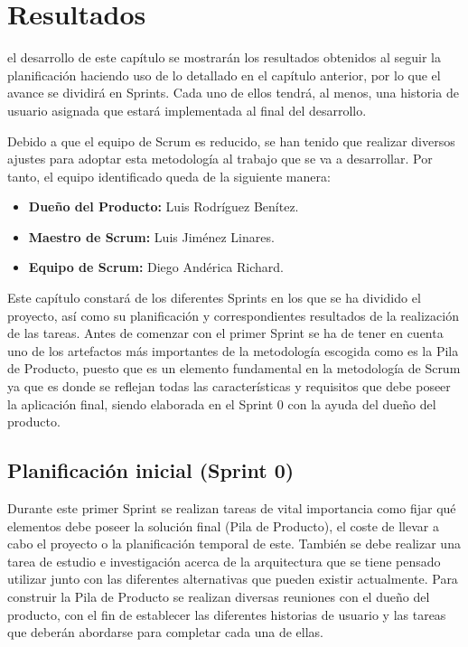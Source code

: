 \chapter{Resultados}
\label{chap:resultados}

 el desarrollo de este capítulo se mostrarán los resultados obtenidos al seguir la planificación haciendo uso de lo detallado en el capítulo anterior, por lo que el avance se dividirá en Sprints. Cada uno de ellos tendrá, al menos, una historia de usuario asignada que estará implementada al final del desarrollo.

Debido a que el equipo de Scrum es reducido, se han tenido que realizar diversos ajustes para adoptar esta metodología al trabajo que se va a desarrollar. Por tanto, el equipo identificado queda de la siguiente manera:

\begin{itemize}
	\item \textbf{Dueño del Producto:} Luis Rodríguez Benítez.
	\item \textbf{Maestro de Scrum:} Luis Jiménez Linares.
	\item \textbf{Equipo de Scrum:} Diego Andérica Richard.
\end{itemize}

Este capítulo constará de los diferentes Sprints en los que se ha dividido el proyecto, así como su planificación y correspondientes resultados de la realización de las tareas. Antes de comenzar con el primer Sprint se ha de tener en cuenta uno de los artefactos más importantes de la metodología escogida como es la Pila de Producto, puesto que es un elemento fundamental en la metodología de Scrum ya que es donde se reflejan todas las características y requisitos que debe poseer la aplicación final, siendo elaborada en el Sprint 0 con la ayuda del dueño del producto.

\clearpage

\section{Planificación inicial (Sprint 0)}
Durante este primer Sprint se realizan tareas de vital importancia como fijar qué elementos debe poseer la solución final (Pila de Producto), el coste de llevar a cabo el proyecto o la planificación temporal de este. También se debe realizar una tarea de estudio e investigación acerca de la arquitectura que se tiene pensado utilizar junto con las diferentes alternativas que pueden existir actualmente. Para construir la Pila de Producto se realizan diversas reuniones con el dueño del producto, con el fin de establecer las diferentes historias de usuario y las tareas que deberán abordarse para completar cada una de ellas.

